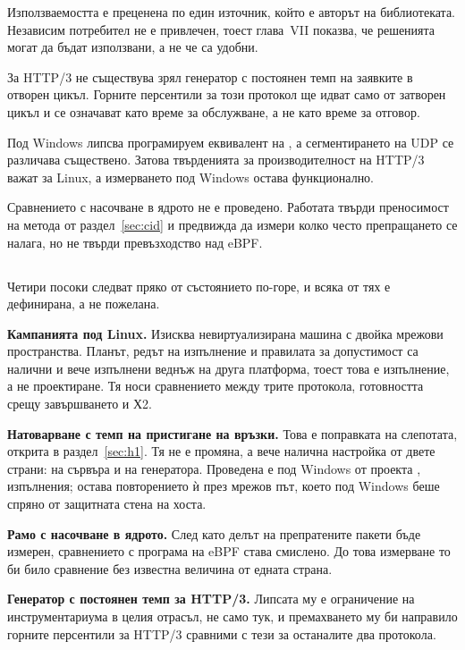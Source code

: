 Използваемостта е преценена по един източник, който е авторът на библиотеката. Независим
потребител не е привлечен, тоест глава~VII показва, че решенията могат да бъдат използвани,
а не че са удобни.

За HTTP/3 не съществува зрял генератор с постоянен темп на заявките в отворен цикъл.
Горните персентили за този протокол ще идват само от затворен цикъл и се означават като
време за обслужване, а не като време за отговор.

Под Windows липсва програмируем еквивалент на , а сегментирането на UDP се различава
съществено. Затова твърденията за производителност на HTTP/3 важат за Linux, а измерването
под Windows остава функционално.

Сравнението с насочване в ядрото не е проведено. Работата твърди преносимост на метода от
раздел~\ref{sec:cid} и предвижда да измери колко често препращането се налага, но не твърди
превъзходство над eBPF.

\subsection*{}

Четири посоки следват пряко от състоянието по-горе, и всяка от тях е дефинирана, а не
пожелана.

\textbf{Кампанията под Linux.} Изисква невиртуализирана машина с двойка мрежови
пространства. Планът, редът на изпълнение и правилата за допустимост са налични и вече
изпълнени веднъж на друга платформа, тоест това е изпълнение, а не проектиране. Тя носи
сравнението между трите протокола, готовността срещу завършването и Х2.

\textbf{Натоварване с темп на пристигане на връзки.} Това е поправката на слепотата, открита
в раздел~\ref{sec:h1}. Тя не е промяна, а вече налична настройка от двете страни:
 на сървъра и  на генератора. Проведена е под
Windows от проекта ,  изпълнения; остава повторението ѝ
през мрежов път, което под Windows беше спряно от защитната стена на хоста.

\textbf{Рамо с насочване в ядрото.} След като делът на препратените пакети бъде измерен,
сравнението с програма на eBPF става смислено. До това измерване то би било сравнение без
известна величина от едната страна.

\textbf{Генератор с постоянен темп за HTTP/3.} Липсата му е ограничение на инструментариума в
целия отрасъл, не само тук, и премахването му би направило горните персентили за HTTP/3
сравними с тези за останалите два протокола.

